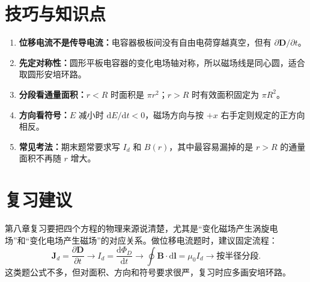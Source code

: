 \documentclass[11pt,a4paper]{ctexart}
\newcommand{\dd}{\mathrm{d}}
\begin{document}
\section*{技巧与知识点}

\begin{tipBox}
\begin{enumerate}
  \item \textbf{位移电流不是传导电流：}电容器极板间没有自由电荷穿越真空，但有 $\partial\bm D/\partial t$。
  \item \textbf{先定对称性：}圆形平板电容器的变化电场轴对称，所以磁场线是同心圆，适合取圆形安培环路。
  \item \textbf{分段看通量面积：}$r<R$ 时面积是 $\pi r^2$；$r>R$ 时有效面积固定为 $\pi R^2$。
  \item \textbf{方向看符号：}$E$ 减小时 $\dd E/\dd t<0$，磁场方向与按 $+x$ 右手定则规定的正方向相反。
  \item \textbf{常见考法：}期末题常要求写 $I_d$ 和 $B(r)$，其中最容易漏掉的是 $r>R$ 的通量面积不再随 $r$ 增大。
\end{enumerate}
\end{tipBox}

\section*{复习建议}

第八章复习要把四个方程的物理来源说清楚，尤其是“变化磁场产生涡旋电场”和“变化电场产生磁场”的对应关系。做位移电流题时，建议固定流程：
\[
  \bm J_d=\frac{\partial\bm D}{\partial t}
  \longrightarrow
  I_d=\frac{\dd\Phi_D}{\dd t}
  \longrightarrow
  \oint\bm B\cdot\dd\bm l=\mu_0I_d
  \longrightarrow
  \text{按半径分段}.
\]
这类题公式不多，但对面积、方向和符号要求很严，复习时应多画安培环路。
\end{document}
